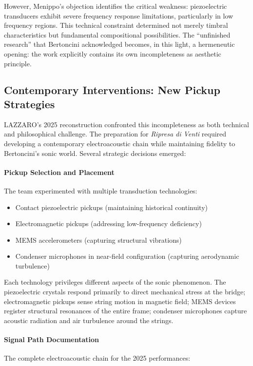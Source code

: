 However, Menippo's objection identifies the critical weakness: piezoelectric 
transducers exhibit severe frequency response limitations, particularly in low 
frequency regions. This technical constraint determined not merely timbral 
characteristics but fundamental compositional possibilities. The ``unfinished 
research'' that Bertoncini acknowledged becomes, in this light, a hermeneutic 
opening: the work explicitly contains its own incompleteness as aesthetic 
principle.

\subsection{Contemporary Interventions: New Pickup Strategies}

LAZZARO's 2025 reconstruction confronted this incompleteness as both technical 
and philosophical challenge. The preparation for \emph{Ripresa di Venti} 
required developing a contemporary electroacoustic chain while maintaining 
fidelity to Bertoncini's sonic world. Several strategic decisions emerged:

\paragraph{Pickup Selection and Placement}
The team experimented with multiple transduction technologies:
\begin{itemize}
  \item Contact piezoelectric pickups (maintaining historical continuity)
  \item Electromagnetic pickups (addressing low-frequency deficiency)
  \item MEMS accelerometers (capturing structural vibrations)
  \item Condenser microphones in near-field configuration (capturing aerodynamic 
  turbulence)
\end{itemize}

Each technology privileges different aspects of the sonic phenomenon. The 
piezoelectric crystals respond primarily to direct mechanical stress at the 
bridge; electromagnetic pickups sense string motion in magnetic field; MEMS 
devices register structural resonances of the entire frame; condenser 
microphones capture acoustic radiation and air turbulence around the strings.

\paragraph{Signal Path Documentation}
The complete electroacoustic chain for the 2025 performances:

